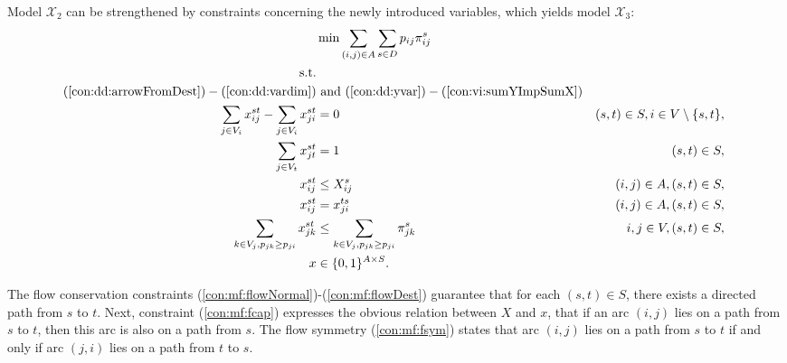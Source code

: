 Model $\mathcal{X}_2$ can be strengthened by constraints concerning the newly introduced variables, which yields model $\mathcal{X}_3$: 
\newline
\newline
\begin{subequations}[resume]\label{eq:smt-x3}
\begin{align}
\notag\makebox[0pt][l]{$\displaystyle{} \min \sum\limits_{(i,j) \in A} \sum\limits_{s \in D} p_{ij} \pi^s_{ij} $}\\
\text{s.t.} \notag \\
(\ref{con:dd:arrowFromDest}) - (\ref{con:dd:vardim}) &\text{ and }(\ref{con:dd:yvar}) - (\ref{con:vi:sumYImpSumX}) \notag\\
\label{con:mf:flowNormal} \sum\limits_{\substack{ j\in V_i}}x^{st}_{ij}-\sum\limits_{\substack{j\in V_i }}x^{st}_{ji} & = 0 & (s,t)\in S, i\in V\setminus\{s,t\},\\
\label{con:mf:flowDest} \sum\limits_{\substack{j\in V_t}}x^{st}_{jt}    & = 1  & (s,t)\in S,\\
\label{con:mf:fcap} x^{st}_{ij} &\leq X^{s}_{ij}& (i,j)\in A, (s,t)\in S,\\
\label{con:mf:fsym} x^{st}_{ij} &=  x^{ts}_{ji}& (i,j)\in A, (s,t)\in S,\\ 
\label{con:vi:sumFImpSumY} \sum\limits_{k\in V_j, p_{jk}\geq p_{ji}}x^{st}_{jk} & \leq \sum\limits_{k\in V_j, p_{jk}\geq p_{ji}}  \pi^{s}_{jk} & i,j\in V, (s,t)\in S,\\
\label{con:mf:xydim} x&\in\{0,1\}^{A\times S}. 
\end{align}~
\end{subequations}

The flow conservation constraints (\ref{con:mf:flowNormal})-(\ref{con:mf:flowDest}) guarantee that for each $(s,t)\in S$, there exists a directed path from $s$ to $t$.
Next, constraint (\ref{con:mf:fcap}) expresses the obvious relation between $X$ and $x$, that if an arc $(i,j)$ lies on a path from $s$ to $t$, then this arc is also on a path from $s$.
The flow symmetry (\ref{con:mf:fsym}) states that arc $(i,j)$ lies on a path from $s$ to $t$ if and only if arc $(j,i)$ lies on a path from $t$ to $s$.

